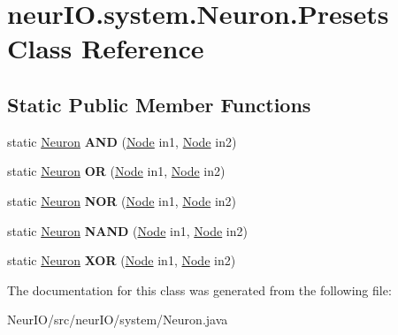 \hypertarget{classneur_i_o_1_1system_1_1_neuron_1_1_presets}{}\section{neur\+I\+O.\+system.\+Neuron.\+Presets Class Reference}
\label{classneur_i_o_1_1system_1_1_neuron_1_1_presets}
\subsection*{Static Public Member Functions}
\begin{DoxyCompactItemize}
\item 
\mbox{\label{classneur_i_o_1_1system_1_1_neuron_1_1_presets_aac0ad8e823e79a8940156bae25849766}} 
static \hyperlink{classneur_i_o_1_1system_1_1_neuron}{Neuron} {\bfseries A\+ND} (\hyperlink{classneur_i_o_1_1system_1_1_node}{Node} in1, \hyperlink{classneur_i_o_1_1system_1_1_node}{Node} in2)
\item 
\mbox{\label{classneur_i_o_1_1system_1_1_neuron_1_1_presets_ae87c4d0f6b3bf97862f991928c4a2158}} 
static \hyperlink{classneur_i_o_1_1system_1_1_neuron}{Neuron} {\bfseries OR} (\hyperlink{classneur_i_o_1_1system_1_1_node}{Node} in1, \hyperlink{classneur_i_o_1_1system_1_1_node}{Node} in2)
\item 
\mbox{\label{classneur_i_o_1_1system_1_1_neuron_1_1_presets_aa2be6544ca34930f542abcceb69d0a8c}} 
static \hyperlink{classneur_i_o_1_1system_1_1_neuron}{Neuron} {\bfseries N\+OR} (\hyperlink{classneur_i_o_1_1system_1_1_node}{Node} in1, \hyperlink{classneur_i_o_1_1system_1_1_node}{Node} in2)
\item 
\mbox{\label{classneur_i_o_1_1system_1_1_neuron_1_1_presets_a2f39bfa406e8b01b232fe104247c439b}} 
static \hyperlink{classneur_i_o_1_1system_1_1_neuron}{Neuron} {\bfseries N\+A\+ND} (\hyperlink{classneur_i_o_1_1system_1_1_node}{Node} in1, \hyperlink{classneur_i_o_1_1system_1_1_node}{Node} in2)
\item 
\mbox{\label{classneur_i_o_1_1system_1_1_neuron_1_1_presets_a2bb6cea449aaca065149cee4d38c5f9d}} 
static \hyperlink{classneur_i_o_1_1system_1_1_neuron}{Neuron} {\bfseries X\+OR} (\hyperlink{classneur_i_o_1_1system_1_1_node}{Node} in1, \hyperlink{classneur_i_o_1_1system_1_1_node}{Node} in2)
\end{DoxyCompactItemize}


The documentation for this class was generated from the following file\+:\begin{DoxyCompactItemize}
\item 
Neur\+I\+O/src/neur\+I\+O/system/Neuron.\+java\end{DoxyCompactItemize}
